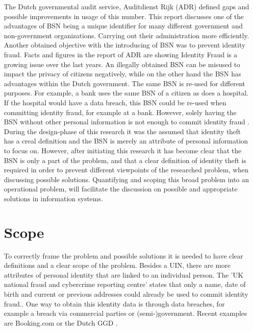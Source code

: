 The Dutch governmental audit service, Auditdienst Rijk (ADR) defined gaps and possible improvements in usage of this number\cite{ADR}. This report discusses one of the advantages of BSN being a unique identifier for many different government and non-government organizations. Carrying out their administration more efficiently. Another obtained objective with the introducing of BSN was to prevent identity fraud. Facts and figures in the report of ADR are showing Identity Fraud is a growing issue over the last years. An illegally obtained BSN can be misused to impact the privacy of citizens negatively, while on the other hand the BSN has advantages within the Dutch government. The same BSN is re-used for different purposes. For example, a bank uses the same BSN of a citizen as does a hospital. If the hospital would have a data breach, this BSN could be re-used when committing identity fraud, for example at a bank. However, solely having the BSN without other personal information is not enough to commit identity fraud . During the design-phase of this research it was the assumed that identity theft has a creal definition and the BSN is merely an attribute of personal information to focus on. However, after initiating this research it has become clear that the BSN is only a part of the problem, and that a clear definition of identity theft is required in order to prevent different viewpoints of the researched problem, when discussing possible solutions. Quantifying and scoping this broad problem into an operational problem, will facilitate the discussion on possible and appropriate solutions in information systems. \par

\section{Scope} \label{scope}
To correctly frame the problem and possible solutions it is needed to have clear definitions and a clear scope of the problem. Besides a UIN, there are more attributes of personal identity that are linked to an individual person. The 'UK national fraud and cybercrime reporting centre' states that only a name, date of birth and current or previous addresses could already be used to commit identity fraud.\cite{Action_fraud}. One way to obtain this identity data is through data breaches, for example a breach via commercial parties or (semi-)government. Recent examples are Booking.com \cite{Booking_databreach} or the Dutch GGD \cite{GGD_databreach}.

